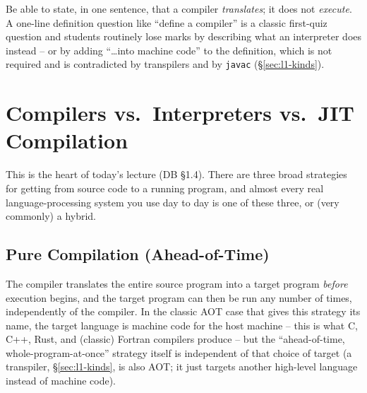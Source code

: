 \documentclass[full-course-notes.tex]{subfiles}
\begin{document}
\begin{examfocus}
Be able to state, in one sentence, that a compiler \emph{translates}; it does not
\emph{execute}. A one-line definition question like ``define a compiler'' is a classic
first-quiz question and students routinely lose marks by describing what an interpreter does
instead -- or by adding ``\ldots into machine code'' to the definition, which is not required
and is contradicted by transpilers and by \texttt{javac} (\S\ref{sec:l1-kinds}).
\end{examfocus}

\section{Compilers vs.\ Interpreters vs.\ JIT Compilation}
\label{sec:l1-comp-interp-jit}

This is the heart of today's lecture (DB \S1.4). There are three broad strategies for getting
from source code to a running program, and almost every real language-processing system you use
day to day is one of these three, or (very commonly) a hybrid.

\subsection{Pure Compilation (Ahead-of-Time)}
\label{sec:l1-pure-compilation}

\dbtag The compiler translates the entire source program into a target program \emph{before}
execution begins, and the target program can then be run any number of times, independently of
the compiler. In the classic AOT case that gives this strategy its name, the target language is
machine code for the host machine -- this is what C, C++, Rust, and (classic) Fortran compilers
produce -- but the ``ahead-of-time, whole-program-at-once'' strategy itself is independent of
that choice of target (a transpiler, \S\ref{sec:l1-kinds}, is also AOT; it just targets another
high-level language instead of machine code).
\end{document}

